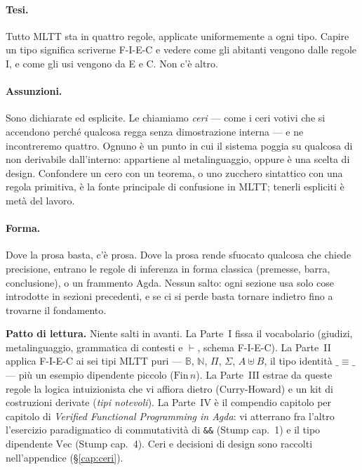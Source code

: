 \documentclass[
  oneside,
  openany,
  titlepage,
  11pt,
  a4paper,
  italian,
  DIV=14,
  headinclude,
  footinclude=true,
  cleardoublepage=empty
]{scrbook}
\theoremstyle{ctplain}
\theoremstyle{ctdef}
\theoremstyle{ctrem}
\theoremstyle{ctcero}
\newcommand{\identita}{\ensuremath{\equiv}}
\begin{document}
\paragraph{Tesi.} Tutto MLTT sta in quattro regole, applicate uniformemente a ogni tipo. Capire un tipo significa scriverne F-I-E-C e vedere come gli abitanti vengono dalle regole I, e come gli usi vengono da E e C. Non c'\`e altro.

\paragraph{Assunzioni.} Sono dichiarate ed esplicite. Le chiamiamo \emph{ceri} --- come i ceri votivi che si accendono perch\'e qualcosa regga senza dimostrazione interna --- e ne incontreremo quattro. Ognuno \`e un punto in cui il sistema poggia su qualcosa di non derivabile dall'interno: appartiene al metalinguaggio, oppure \`e una scelta di design. Confondere un cero con un teorema, o uno zucchero sintattico con una regola primitiva, \`e la fonte principale di confusione in MLTT; tenerli espliciti \`e met\`a del lavoro.

\paragraph{Forma.} Dove la prosa basta, c'\`e prosa. Dove la prosa rende sfuocato qualcosa che chiede precisione, entrano le regole di inferenza in forma classica (premesse, barra, conclusione), o un frammento Agda. Nessun salto: ogni sezione usa solo cose introdotte in sezioni precedenti, e se ci si perde basta tornare indietro fino a trovarne il fondamento.

\bigskip

\noindent\textbf{Patto di lettura.} Niente salti in avanti. La Parte~I fissa il vocabolario (giudizi, metalinguaggio, grammatica di contesti e $\vdash$, schema F-I-E-C). La Parte~II applica F-I-E-C ai sei tipi MLTT puri --- $\mathbb{B}$, $\mathbb{N}$, $\Pi$, $\Sigma$, $A \uplus B$, il tipo identit\`a $\_\identita\_$ --- pi\`u un esempio dipendente piccolo ($\mathrm{Fin}\,n$). La Parte~III estrae da queste regole la logica intuizionista che vi affiora dietro (Curry-Howard) e un kit di costruzioni derivate (\emph{tipi notevoli}). La Parte~IV \`e il compendio capitolo per capitolo di \emph{Verified Functional Programming in Agda}: vi atterrano fra l'altro l'esercizio paradigmatico di commutativit\`a di \texttt{\&\&} (Stump cap.~1) e il tipo dipendente $\mathrm{Vec}$ (Stump cap.~4). Ceri e decisioni di design sono raccolti nell'appendice (\S\ref{cap:ceri}).
\end{document}
